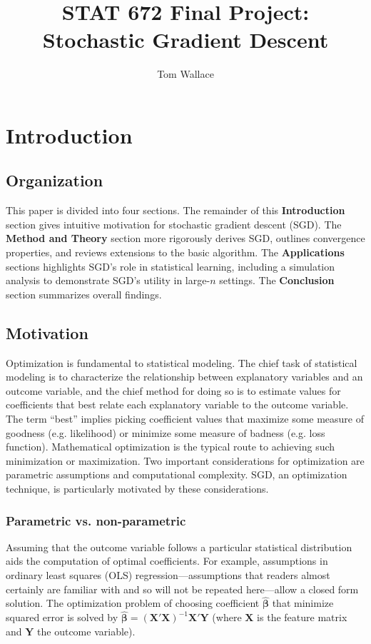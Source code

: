 \documentclass{article}
\author{Tom Wallace}
\title{STAT 672 Final Project:\\ Stochastic Gradient Descent}
\begin{document}
\maketitle

\section{Introduction}

\subsection{Organization}

This paper is divided into four sections. The remainder of this
\textbf{Introduction} section gives intuitive motivation for stochastic gradient
descent (SGD). The \textbf{Method and Theory} section more rigorously derives
SGD, outlines convergence properties, and reviews extensions to the basic
algorithm. The \textbf{Applications} sections highlights SGD's role in
statistical learning, including a simulation analysis to demonstrate SGD's utility
in large-$n$ settings. The \textbf{Conclusion} section summarizes
overall findings.

\subsection{Motivation}

Optimization is fundamental to statistical modeling. The chief task of
statistical modeling is to characterize the relationship between 
explanatory variables and an outcome variable, and the chief method for doing so
is to estimate values for coefficients that best relate
each explanatory variable to the outcome variable. The term ``best''
implies picking coefficient values that
maximize some measure of goodness (e.g. likelihood) or minimize some measure of
badness (e.g. loss function). 
Mathematical optimization is the typical
route to achieving such minimization or maximization. Two important
considerations for optimization are parametric assumptions and computational
complexity. SGD, an optimization technique, is
particularly motivated by these considerations.

\subsubsection{Parametric vs. non-parametric}

Assuming that the outcome variable follows a
particular statistical distribution aids the computation of optimal coefficients. 
For example, assumptions in ordinary least squares (OLS)
regression---assumptions that readers almost certainly are familiar with and so will not be
repeated here---allow a closed form solution. The optimization problem of
choosing coefficient $\hat{\bm{\beta}}$ that minimize squared error is solved
by $\hat{\bm{\beta}} = (\bm{X}'\bm{X})^{-1}\bm{X}'\bm{Y}$ (where $\bm{X}$ is the
feature matrix and $\bm{Y}$ the outcome variable).
\end{document}
